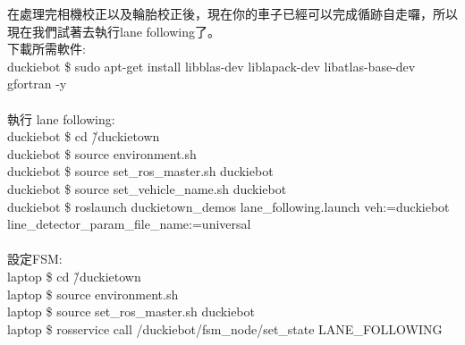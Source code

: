 \documentclass{article}
\begin{document}
在處理完相機校正以及輪胎校正後，現在你的車子已經可以完成循跡自走囉，所以現在我們試著去執行lane following了。
\\下載所需軟件:
\\duckiebot \$ sudo apt-get install libblas-dev liblapack-dev libatlas-base-dev gfortran -y
\\
\\執行 lane following:
\\duckiebot \$ cd \~/duckietown
\\duckiebot \$ source environment.sh
\\duckiebot \$ source set\_ros\_master.sh duckiebot
\\duckiebot \$ source set\_vehicle\_name.sh duckiebot
\\duckiebot \$ roslaunch duckietown\_demos lane\_following.launch veh:=duckiebot line\_detector\_param\_file\_name:=universal
\\
\\設定FSM:
\\laptop \$ cd \~/duckietown
\\laptop \$ source environment.sh
\\laptop \$ source set\_ros\_master.sh duckiebot
\\laptop \$ rosservice call /duckiebot/fsm\_node/set\_state LANE\_FOLLOWING
\end{document}
